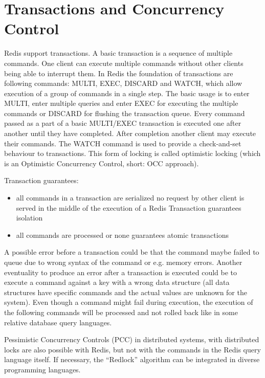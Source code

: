 \chapter{Transactions and Concurrency Control}

Redis support transactions. A basic transaction is a sequence of multiple commands. One client can execute multiple commands without other clients being able to interrupt them. In Redis the foundation of transactions are following commands: MULTI, EXEC, DISCARD and WATCH, which allow execution of a group of commands in a single step. The basic usage is to enter MULTI, enter multiple queries and enter EXEC for executing the multiple commands or  DISCARD for flushing the transaction queue. Every command passed as a part of a basic MULTI/EXEC transaction is executed one after another until they have completed. After completion another client may execute their commands. The WATCH command is used to provide a check-and-set behaviour to transactions. This form of locking is called optimistic locking (which is an Optimistic Concurrency Control, short: OCC approach).

Transaction guarantees:
\begin{itemize}
\item all commands in a transaction are serialized no request by other client is served in the middle of the execution of a Redis Transaction guarantees isolation
\item all commands are processed or none guarantees atomic transactions 
\end{itemize}

A possible error before a transaction could be that the command maybe failed to queue due to wrong syntax of the command or e.g. memory errors. Another eventuality to produce an error after a transaction is executed could be to execute a command against a key with a wrong data structure (all data structures have specific commands and the actual values are unknown for the system). Even though a command might fail during execution, the execution of the following commands will be processed and not rolled back like in some relative database query languages.

Pessimistic Concurrency Controls (PCC) in distributed systems, with distributed locks are also possible with Redis, but not with the commands in the Redis query language itself. If necessary, the “Redlock” algorithm can be integrated in diverse programming languages.
